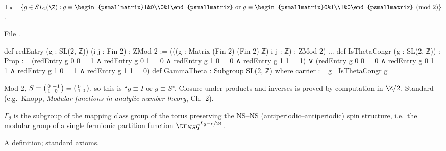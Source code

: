 \begin{definition}\label{l17:def:gammatheta}
$\Gamma_\theta=\{g\in SL_2(\Z): g\equiv\begin{psmallmatrix}1&0\\0&1\end{psmallmatrix}\text{ or }
g\equiv\begin{psmallmatrix}0&1\\1&0\end{psmallmatrix}\pmod 2\}$.
\end{definition}
\noindent File .
\begin{leancode}
def redEntry (g : SL(2, ℤ)) (i j : Fin 2) : ZMod 2 :=
  (((g : Matrix (Fin 2) (Fin 2) ℤ) i j : ℤ) : ZMod 2)
...
def IsThetaCongr (g : SL(2, ℤ)) : Prop :=
  (redEntry g 0 0 = 1 ∧ redEntry g 0 1 = 0 ∧ redEntry g 1 0 = 0 ∧ redEntry g 1 1 = 1) ∨
    (redEntry g 0 0 = 0 ∧ redEntry g 0 1 = 1 ∧ redEntry g 1 0 = 1 ∧ redEntry g 1 1 = 0)
def GammaTheta : Subgroup SL(2, ℤ) where
  carrier := {g | IsThetaCongr g}
\end{leancode}
\begin{dictionary}
Mod $2$, $S=\begin{psmallmatrix}0&-1\\1&0\end{psmallmatrix}\equiv\begin{psmallmatrix}0&1\\1&0\end{psmallmatrix}$,
so this is ``$g\equiv I$ or $g\equiv S$''. Closure under products and inverses is proved by computation
in $\Z/2$. Standard (e.g.\ Knopp, \emph{Modular functions in analytic number theory}, Ch.~2).
\end{dictionary}
\begin{physics}
$\Gamma_\theta$ is the subgroup of the mapping class group of the torus preserving the NS--NS
(antiperiodic--antiperiodic) spin structure, i.e.\ the modular group of a single fermionic partition
function $\tr_{NS}q^{L_0-c/24}$.
\end{physics}
\begin{status}
A definition; standard axioms.
\end{status}

